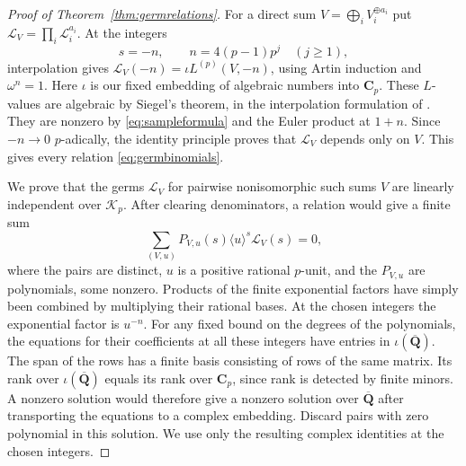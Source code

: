 \documentclass[11pt]{amsart}
\numberwithin{equation}{section}
\theoremstyle{definition}
\theoremstyle{remark}
\newcommand{\Qbar}{\overline{\mathbf Q}}
\newcommand{\Cp}{\mathbf C_p}
\begin{document}
\begin{proof}[Proof of Theorem~\ref{thm:germrelations}]
For a direct sum $V=\bigoplus_iV_i^{\oplus a_i}$ put
$\mathcal L_V=\prod_i\mathcal L_i^{a_i}$. At the integers
\[
                s=-n,\qquad n=4(p-1)p^j\quad(j\ge1),
\]
interpolation gives $\mathcal L_V(-n)=\iota L^{(p)}(V,-n)$,
using Artin induction and $\omega^n=1$. Here $\iota$ is our fixed
embedding of algebraic numbers into $\Cp$. These $L$-values are
algebraic by Siegel's theorem, in the interpolation formulation
of \cite[eq.~(3) and the following paragraph]{DKV}. They are nonzero by
\eqref{eq:sampleformula} and the Euler product at $1+n$.
Since $-n\to0$ $p$-adically, the identity principle proves that
$\mathcal L_V$ depends only on $V$. This gives every relation
\eqref{eq:germbinomials}.

We prove that the germs $\mathcal L_V$ for pairwise nonisomorphic
such sums $V$ are linearly independent over $\mathcal K_p$.
After clearing denominators, a relation would give a finite sum
\begin{equation}\label{eq:clearedgerms}
 \sum_{(V,u)} P_{V,u}(s)\langle u\rangle^s\mathcal L_V(s)=0 ,
\end{equation}
where the pairs are distinct, $u$ is a positive rational $p$-unit,
and the $P_{V,u}$ are polynomials, some nonzero. Products of the
finite exponential factors have simply been combined by
multiplying their rational bases. At the chosen integers the
exponential factor is $u^{-n}$. For any fixed bound on the degrees
of the polynomials, the equations for their coefficients at all
these integers have entries in $\iota(\Qbar)$. The span of the rows
has a finite basis consisting of rows of the same matrix. Its rank
over $\iota(\Qbar)$ equals its rank over $\Cp$, since rank is
detected by finite minors. A nonzero solution would therefore give
a nonzero solution over $\Qbar$ after transporting the equations
to a complex embedding. Discard pairs with zero polynomial in this
solution. We use only the resulting complex identities at the chosen
integers.


\end{proof}
\end{document}
